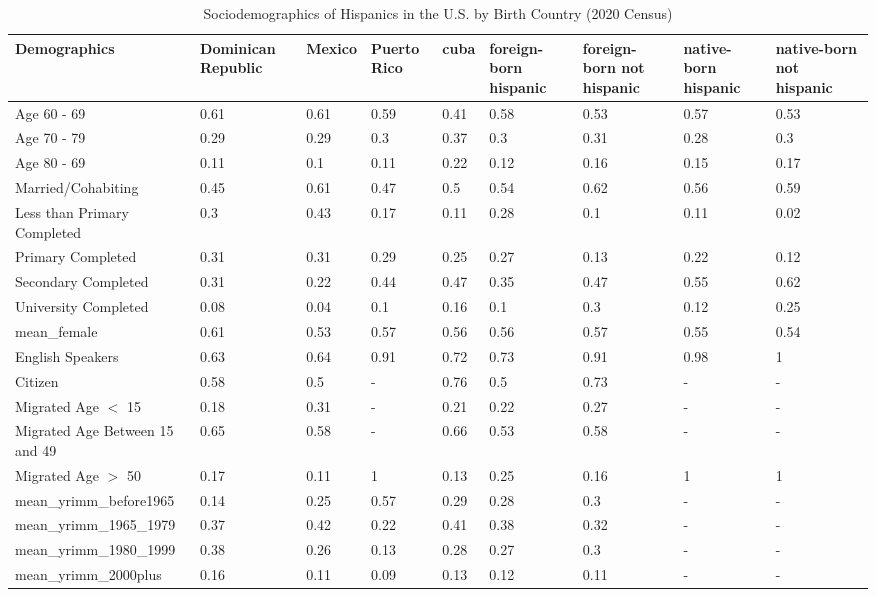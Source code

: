 \documentclass[
]{article}
\begin{document}
\begin{landscape}
\begin{table}[ht] %
\centering
\caption{Sociodemographics of Hispanics in the U.S. by Birth Country (2020 Census)} 
\begingroup\small
\begin{tabular}{l|llllllll}
  \hline
Demographics & Dominican Republic & Mexico & Puerto Rico & cuba & foreign-born hispanic & foreign-born not hispanic & native-born hispanic & native-born not hispanic \\ 
  \hline
Age 60 - 69 & 0.61 & 0.61 & 0.59 & 0.41 & 0.58 & 0.53 & 0.57 & 0.53 \\ 
  Age 70 - 79 & 0.29 & 0.29 & 0.3 & 0.37 & 0.3 & 0.31 & 0.28 & 0.3 \\ 
  Age 80 - 69 & 0.11 & 0.1 & 0.11 & 0.22 & 0.12 & 0.16 & 0.15 & 0.17 \\ 
  Married/Cohabiting & 0.45 & 0.61 & 0.47 & 0.5 & 0.54 & 0.62 & 0.56 & 0.59 \\ 
  Less than Primary Completed & 0.3 & 0.43 & 0.17 & 0.11 & 0.28 & 0.1 & 0.11 & 0.02 \\ 
  Primary Completed & 0.31 & 0.31 & 0.29 & 0.25 & 0.27 & 0.13 & 0.22 & 0.12 \\ 
  Secondary Completed & 0.31 & 0.22 & 0.44 & 0.47 & 0.35 & 0.47 & 0.55 & 0.62 \\ 
  University Completed & 0.08 & 0.04 & 0.1 & 0.16 & 0.1 & 0.3 & 0.12 & 0.25 \\ 
  mean\_female & 0.61 & 0.53 & 0.57 & 0.56 & 0.56 & 0.57 & 0.55 & 0.54 \\ 
  English Speakers & 0.63 & 0.64 & 0.91 & 0.72 & 0.73 & 0.91 & 0.98 & 1 \\ 
  Citizen & 0.58 & 0.5 & - & 0.76 & 0.5 & 0.73 & - & - \\ 
  Migrated Age $<$ 15 & 0.18 & 0.31 & - & 0.21 & 0.22 & 0.27 & - & - \\ 
  Migrated Age Between 15 and 49 & 0.65 & 0.58 & - & 0.66 & 0.53 & 0.58 & - & - \\ 
  Migrated Age $>$ 50 & 0.17 & 0.11 & 1 & 0.13 & 0.25 & 0.16 & 1 & 1 \\ 
  mean\_yrimm\_before1965 & 0.14 & 0.25 & 0.57 & 0.29 & 0.28 & 0.3 & - & - \\ 
  mean\_yrimm\_1965\_1979 & 0.37 & 0.42 & 0.22 & 0.41 & 0.38 & 0.32 & - & - \\ 
  mean\_yrimm\_1980\_1999 & 0.38 & 0.26 & 0.13 & 0.28 & 0.27 & 0.3 & - & - \\ 
  mean\_yrimm\_2000plus & 0.16 & 0.11 & 0.09 & 0.13 & 0.12 & 0.11 & - & - \\ 
   \hline
\end{tabular}
\endgroup
\end{table}



\end{landscape}
\end{document}
